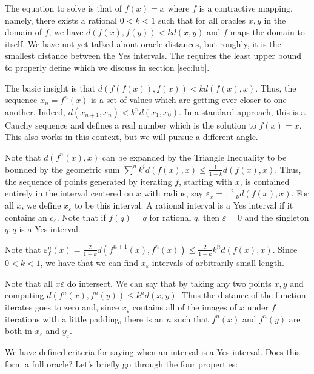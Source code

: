 \documentclass[12pt]{article}
\begin{document}
The equation to solve is that of $f(x) = x$ where $f$ is a contractive mapping, namely, there exists a rational $0 < k < 1$ such that for all oracles $x,y$ in the domain of $f$, we have $d(f(x), f(y)) < k d(x,y)$ and $f$ maps the domain to itself. We have not yet talked about oracle distances, but roughly, it is the smallest distance between the Yes intervals. The requires the least upper bound to properly define which we discuss in section \ref{sec:lub}. 

The basic insight is that $d(f(f(x)), f(x)) < k d(f(x), x)$. Thus, the sequence $x_n = f^n (x)$ is a set of values which are getting ever closer to one another. Indeed, $d(x_{n+1}, x_n) < k^n d(x_1, x_0)$. In a standard approach, this is a Cauchy sequence and defines a real number which is the solution to $f(x) = x$. This also works in this context, but we will pursue a different angle. 

Note that $d(f^n(x), x)$ can be expanded by the Triangle Inequality to be bounded by the geometric sum $\sum^n k^i d(f(x), x) \leq \frac{1}{1-k} d(f(x),x)$. Thus, the sequence of points generated by iterating $f$, starting with $x$, is contained entirely in the interval centered on $x$ with radius, say $\varepsilon_x = \frac{2}{1-k} d(f(x),x)$. For all $x$, we define $x_\varepsilon$ to be this interval. A rational interval is a Yes interval if it contains an $c_\varepsilon$. Note that if $f(q) = q$ for rational $q$, then $\varepsilon = 0$ and the singleton $q:q$ is a Yes interval.  

Note that $\varepsilon_f^n(x) = \frac{2}{1-k} d(f^{n+1}(x), f^n(x)) \leq \frac{2}{1-k} k^n d(f(x),x)$. Since $0 < k < 1$, we have that we can find $x_\varepsilon$ intervals of arbitrarily small length. 

Note that all $x\varepsilon$ do intersect. We can say that by taking any two points $x, y$ and computing $d(f^n(x), f^n(y)) \leq k^n d(x, y)$. Thus the distance of the function iterates goes to zero and, since $x_\varepsilon$ contains all of the images of $x$ under $f$ iterations with a little padding, there is an $n$ such that $f^n(x)$ and $f^n(y)$ are both in $x_\varepsilon$ and $y_\varepsilon$. 

We have defined criteria for saying when an interval is a Yes-interval. Does this form a full oracle? Let's briefly go through the four properties: 
\end{document}
